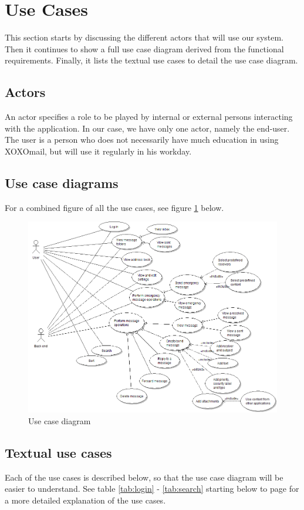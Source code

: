 \section{Use Cases}
This section starts by discussing the different actors that will use our system. Then it continues to show a full use case diagram derived from the functional requirements. Finally, it lists the textual use cases to detail the use case diagram.

\subsection{Actors}
An actor specifies a role to be played by internal or external persons interacting with the application. In our case, we have only one actor, namely the end-user. The user is a person who does not necessarily have much education in using XOXOmail, but will use it regularly in his workday. 

\subsection{Use case diagrams}
For a combined figure of all the use cases, see figure \ref{fig:usecase} below.

\begin{figure}[h!]
\begin{center}
\includegraphics[width=\textwidth]{kpro-use-case}
\caption{Use case diagram} \label{fig:usecase}
\end{center}
\end{figure}

\subsection{Textual use cases}
Each of the use cases is described below, so that the use case diagram will be easier to understand. See table \ref{tab:login} - \ref{tab:search} starting below to page \pageref{tab:search} for a more detailed explanation of the use cases.


